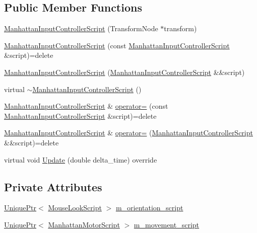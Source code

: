 \subsection*{Public Member Functions}
\begin{DoxyCompactItemize}
\item 
\hyperlink{classmage_1_1_manhattan_input_controller_script_a51b746c88210f1ca07711526cb91ec71}{Manhattan\+Input\+Controller\+Script} (Transform\+Node $\ast$transform)
\item 
\hyperlink{classmage_1_1_manhattan_input_controller_script_ad16da80362158de342ecf8d669fbbe15}{Manhattan\+Input\+Controller\+Script} (const \hyperlink{classmage_1_1_manhattan_input_controller_script}{Manhattan\+Input\+Controller\+Script} \&script)=delete
\item 
\hyperlink{classmage_1_1_manhattan_input_controller_script_a5e281b4e16a7b1ead6c31ca742d7d79c}{Manhattan\+Input\+Controller\+Script} (\hyperlink{classmage_1_1_manhattan_input_controller_script}{Manhattan\+Input\+Controller\+Script} \&\&script)
\item 
virtual \hyperlink{classmage_1_1_manhattan_input_controller_script_a3cf134df3084aeffc7ac87a066ecb0c4}{$\sim$\+Manhattan\+Input\+Controller\+Script} ()
\item 
\hyperlink{classmage_1_1_manhattan_input_controller_script}{Manhattan\+Input\+Controller\+Script} \& \hyperlink{classmage_1_1_manhattan_input_controller_script_a07fdb2fee8a1eb793c2d54853c9e4998}{operator=} (const \hyperlink{classmage_1_1_manhattan_input_controller_script}{Manhattan\+Input\+Controller\+Script} \&script)=delete
\item 
\hyperlink{classmage_1_1_manhattan_input_controller_script}{Manhattan\+Input\+Controller\+Script} \& \hyperlink{classmage_1_1_manhattan_input_controller_script_acea874b94a4531c393af739824012a1a}{operator=} (\hyperlink{classmage_1_1_manhattan_input_controller_script}{Manhattan\+Input\+Controller\+Script} \&\&script)=delete
\item 
virtual void \hyperlink{classmage_1_1_manhattan_input_controller_script_adfd98377642722fae5db6e005b2c6c3e}{Update} (double delta\+\_\+time) override
\end{DoxyCompactItemize}
\subsection*{Private Attributes}
\begin{DoxyCompactItemize}
\item 
\hyperlink{namespacemage_a3316d7143a973e37adf1110f2e80ca31}{Unique\+Ptr}$<$ \hyperlink{classmage_1_1_mouse_look_script}{Mouse\+Look\+Script} $>$ \hyperlink{classmage_1_1_manhattan_input_controller_script_add3be278d93719ba235d4606d555bd2a}{m\+\_\+orientation\+\_\+script}
\item 
\hyperlink{namespacemage_a3316d7143a973e37adf1110f2e80ca31}{Unique\+Ptr}$<$ \hyperlink{classmage_1_1_manhattan_motor_script}{Manhattan\+Motor\+Script} $>$ \hyperlink{classmage_1_1_manhattan_input_controller_script_ad3b6525bba021f03c17d2de6f5e54101}{m\+\_\+movement\+\_\+script}
\end{DoxyCompactItemize}
